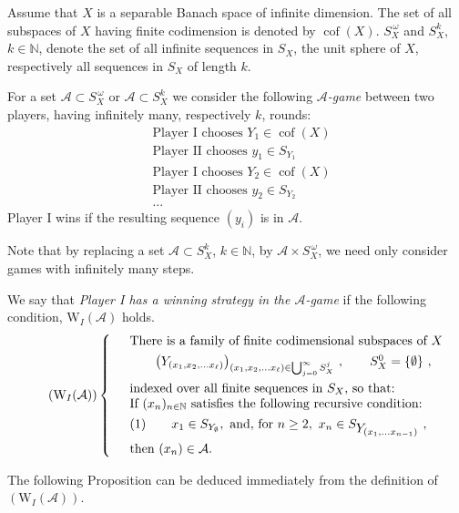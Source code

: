 \documentclass[11pt,leqno]{amsart}
\theoremstyle{definition}
\def\rW{\text{\rm W}}
\newcommand{\ds}{\displaystyle}
\newcommand{\cof}{\operatorname{cof}}
\newcommand{\cA}{\mathcal{A}}
\newcommand{\N}{\mathbb{N}}
\begin{document}
Assume that $X$ is a separable Banach space of infinite dimension. The set of all subspaces of $X$
having  finite codimension is denoted by $\cof(X)$.  
 $S_X^{\,\omega}$ and $ S_X^k$, $k\in \N$, denote the
set of all infinite sequences in $S_X$, the unit sphere of $X$, respectively 
all sequences in $S_X$ of length $k$.

For a  set $\cA\subset S_X^{\,\omega}$ or  $\cA\subset S_X^k$ 
we consider the following
{\em $\cA$-game\/} between two players, having infinitely many,  
respectively $k$, rounds: 
\begin{align*}
&\text{Player I chooses } Y_1\in\cof(X)\\
&\text{Player II chooses }y_1\in S_{Y_1}\\
&\text{Player I chooses }Y_2\in\cof(X)\\
&\text{Player II chooses }y_2\in S_{Y_2}\\
&\ldots
\end{align*}
Player I wins if the resulting sequence $(y_i)$ is in $\cA$.
  
Note that by replacing a set $\cA\subset S^k_X$, $k\in \N$, 
by $\cA\times S_X^{\,\omega}$, we need 
only consider games with infinitely many steps.

We say that {\em Player I has a winning strategy in the $\cA$-game\/} 
if the following condition, $\text{W}_I(\cA)$ holds.
%
\begin{equation}\tag*{$(\rW_I(\cA))$}
\left\{ \begin{array}{cl}
&\text{There is a family of finite codimensional subspaces of $X$}\\
\noalign{\vskip4pt}
&\qquad \bigl( Y_{(x_1,x_2,\ldots x_\ell)}\bigr)_{(x_1,x_2,\ldots x_\ell)\in 
\bigcup_{j=0}^\infty S^j_X}\ , \qquad S^0_X=\{\emptyset\}\ ,\\
\noalign{\vskip4pt}
&\text{indexed over all finite sequences in $S_X$, so that:}\\
&\text{If $(x_n)_{n\in\N}$  satisfies the following recursive condition:}\\
\noalign{\vskip4pt}
&(1)\qquad x_1\in S_{Y_\emptyset}, \text{ and, for }n\ge 2,\ 
x_n\in S_{\ds Y_{(x_1,\ldots x_{n-1})}}\ ,\\
\noalign{\vskip4pt}
&\text{then $(x_n)\in \cA$.} 
\end{array} \right.
\end{equation}
\addtocounter{equation}{1}

The following Proposition can be deduced immediately from the 
definition of $(\text{W}_{I}(\cA))$. 
\end{document}
